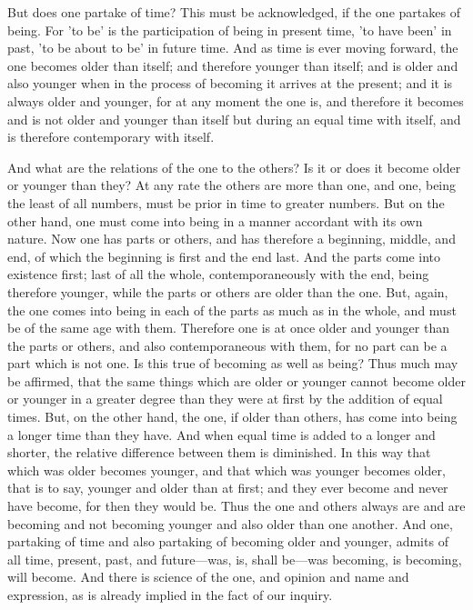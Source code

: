\documentclass[11pt,letter]{article}
\begin{document}
\par  But does one partake of time? This must be acknowledged, if the one partakes of being. For 'to be' is the participation of being in present time, 'to have been' in past, 'to be about to be' in future time. And as time is ever moving forward, the one becomes older than itself; and therefore younger than itself; and is older and also younger when in the process of becoming it arrives at the present; and it is always older and younger, for at any moment the one is, and therefore it becomes and is not older and younger than itself but during an equal time with itself, and is therefore contemporary with itself.

\par  And what are the relations of the one to the others? Is it or does it become older or younger than they? At any rate the others are more than one, and one, being the least of all numbers, must be prior in time to greater numbers. But on the other hand, one must come into being in a manner accordant with its own nature. Now one has parts or others, and has therefore a beginning, middle, and end, of which the beginning is first and the end last. And the parts come into existence first; last of all the whole, contemporaneously with the end, being therefore younger, while the parts or others are older than the one. But, again, the one comes into being in each of the parts as much as in the whole, and must be of the same age with them. Therefore one is at once older and younger than the parts or others, and also contemporaneous with them, for no part can be a part which is not one. Is this true of becoming as well as being? Thus much may be affirmed, that the same things which are older or younger cannot become older or younger in a greater degree than they were at first by the addition of equal times. But, on the other hand, the one, if older than others, has come into being a longer time than they have. And when equal time is added to a longer and shorter, the relative difference between them is diminished. In this way that which was older becomes younger, and that which was younger becomes older, that is to say, younger and older than at first; and they ever become and never have become, for then they would be. Thus the one and others always are and are becoming and not becoming younger and also older than one another. And one, partaking of time and also partaking of becoming older and younger, admits of all time, present, past, and future—was, is, shall be—was becoming, is becoming, will become. And there is science of the one, and opinion and name and expression, as is already implied in the fact of our inquiry.
\end{document}
